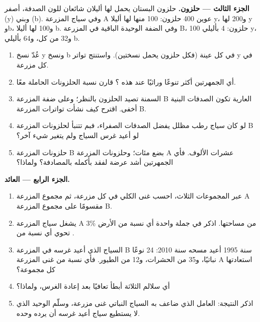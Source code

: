\begin{problem}
\medskip
\noindent\textbf{الجزء الثالث ---  حلزون.}
حلزون البستان يحمل  لها أليلان شائعان للون الصدفة، أصفر (y)
وبني (b). وفي سياج المزرعة A عوين 400 حلزون: 100 منها لها أليلا y،
و200 لها y وb، و100 لها أليلا b. وفي الضفة الوحيدة الباقية في المزرعة
B، 100 حلزون: 4 بأليلي y، و32  من كل، و64 بأليلي b.
\begin{enumerate}[resume]
  \item عُدّ نسخ y ونسخ b في كل عينة (فكل حلزون يحمل نسختين). واستنتج
        تواتر y في كل مزرعة.
  \item أي الجمهرتين أكثر تنوعًا وراثيًا عند هذه ؟ قارن نسبة
        الحلزونات الحاملة  معًا.
  \item السمنة تصيد الحلزون بالنظر؛ وعلى ضفة المزرعة B العارية تكون
        الصدفات البنية أخفى. اقترح كيف نشأت تواترات المزرعة B.
  \item لو كان سياج رطب مظلل يفضل الصدفات الصفراء، فبم تتنبأ لحلزونات
        المزرعة B لو أعيد غرس السياج ولم يتغير شيء آخر؟
  \item حلزونات المزرعة B بضع مئات؛ وحلزونات المزرعة A عشرات الألوف.
        فأي الجمهرتين أشد عرضة لفقد  بأكمله بالمصادفة؟ ولماذا؟
\end{enumerate}

\medskip
\noindent\textbf{الجزء الرابع --- العائد.}
\begin{enumerate}[resume]
  \item عبر المجموعات الثلاث، احسب غنى  الكلي في كل مزرعة، ثم
        مجموع المزرعة A مقسومًا على مجموع المزرعة B.
  \item يشغل سياج المزرعة A 3\% من مساحتها. اذكر في جملة واحدة أي
        نسبة من الأرض تحوي أي نسبة من .
  \item السياج الذي أعيد غرسه في المزرعة B سنة 1995 أعيد مسحه سنة
        2010: 24 نوعًا نباتيًا، و35 من الحشرات، و12 من الطيور. فأي
        نسبة من غنى المزرعة A استعادتها كل مجموعة؟
  \item أي سلالم  الثلاثة أبطأ تعافيًا بعد إعادة الغرس،
        ولماذا؟
  \item اذكر النتيجة: العامل الذي ضاعف به السياج النباتي غنى 
        مزرعة، وسلّم  الوحيد الذي لا يستطيع سياج أعيد
        غرسه أن يرده وحده.
\end{enumerate}
\end{problem}
